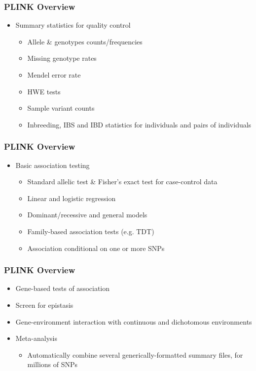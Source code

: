 \documentclass{beamer}
\begin{document}
  \begin{frame}
	\frametitle{\bf PLINK Overview}
	\begin{itemize}
\item Summary statistics for quality control
\begin{itemize}
	\item Allele \& genotypes counts/frequencies
	\item Missing genotype rates
	\item Mendel error rate
	\item HWE tests
	\item Sample  variant counts
	\item Inbreeding, IBS and IBD statistics for individuals and pairs of individuals
\end{itemize}
	\end{itemize}
\end{frame}


\begin{frame}
\frametitle{\bf PLINK Overview}
\begin{itemize}
\item Basic association testing
\begin{itemize}
		\item Standard allelic test \& Fisher's exact test for case-control data
	\item Linear and logistic regression
		\item Dominant/recessive and general models
		    \item Family-based association tests (e.g. TDT)
	\item Association conditional on one or more SNPs
	\end{itemize}

\end{itemize}
\end{frame}



\begin{frame}
\frametitle{\bf PLINK Overview}
\begin{itemize}
\item  Gene-based tests of association
\item Screen for epistasis
\item Gene-environment interaction with continuous and dichotomous environments
\item Meta-analysis
\begin{itemize}
    \item Automatically combine several generically-formatted summary files, for millions of SNPs
\end{itemize}
\end{itemize}
\end{frame}
\end{document}
